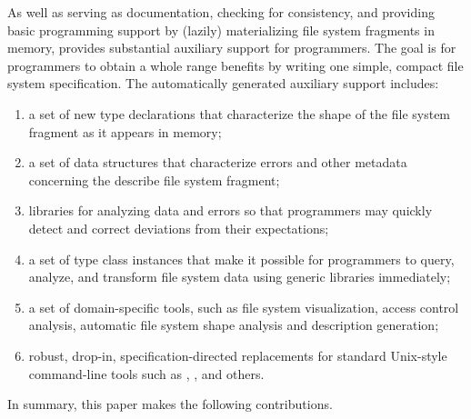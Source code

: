 As well as serving as documentation, checking for consistency, and 
providing basic programming
support by (lazily) materializing file system fragments in memory, \forest{}
provides substantial auxiliary support for
programmers.  The goal is for programmers to obtain a whole range
benefits by writing one simple, compact file system specification.
The automatically generated auxiliary support includes:
\begin{enumerate}
\item a set of new type declarations that characterize
the shape of the file system fragment as it appears in memory; 
\item a set of data structures that characterize errors and other metadata
concerning the describe file system fragment;
\item libraries for analyzing
data and errors so that programmers may quickly detect
and correct deviations from their expectations;
\item a set of \haskell{} type class instances that make it possible for
programmers to query, analyze, and transform file system data using generic
libraries immediately;
\item a set of domain-specific tools, such as file system visualization,
access control analysis, automatic file system shape analysis and description
generation;
\item robust, drop-in, specification-directed replacements for standard
Unix-style command-line tools such as , ,  and
others.
\end{enumerate}
In summary, this paper makes the following contributions.

